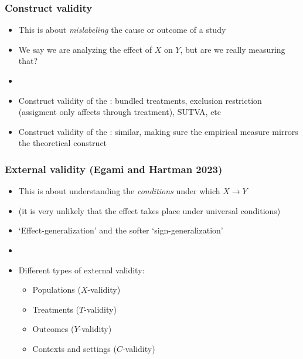 \documentclass[aspectratio=43]{beamer}
\begin{document}
\begin{frame}
\frametitle{Construct validity}
\centering

\begin{itemize}
  \item This is about \textit{mislabeling} the cause or outcome of a study
  \item We say we are analyzing the effect of $X$ on $Y$, but are we really measuring that?
  \item[]
  \item<2->[1.] Construct validity of the : bundled treatments, exclusion restriction (assigment only affects through treatment), SUTVA, etc
  \item<3->[2.] Construct validity of the : similar, making sure the empirical measure mirrors the theoretical construct
\end{itemize}

\end{frame}

\begin{frame}
\frametitle{External validity (Egami and Hartman 2023)}
\centering

\begin{itemize}
  \item This is about understanding the \textit{conditions} under which $X \rightarrow Y$
  \item[] {\small (it is very unlikely that the effect takes place under universal conditions)}
  \item<2-> `Effect-generalization' and the softer `sign-generalization'
  \item[]
  \item<3-> Different types of external validity:
  \begin{itemize}
    \item Populations ($X$-validity)
    \item Treatments ($T$-validity)
    \item Outcomes ($Y$-validity)
    \item Contexts and settings ($C$-validity)
  \end{itemize}
\end{itemize}

\end{frame}
\end{document}
